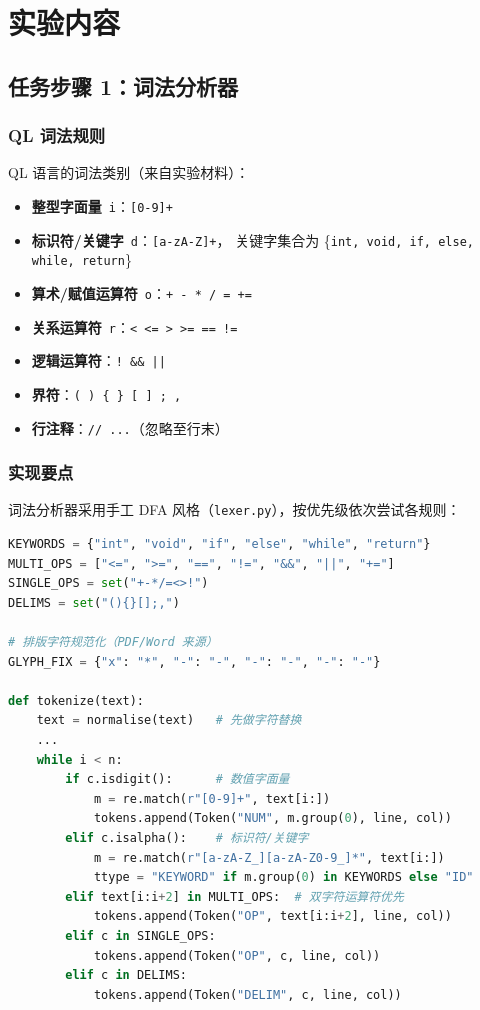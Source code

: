 \documentclass[12pt,a4paper]{ctexart}
\begin{document}
\section{实验内容}

\subsection{任务步骤 1：词法分析器}

\subsubsection{QL 词法规则}

QL 语言的词法类别（来自实验材料）：

\begin{itemize}
  \item \textbf{整型字面量}~\texttt{i}：\texttt{[0-9]+}
  \item \textbf{标识符/关键字}~\texttt{d}：\texttt{[a-zA-Z]+}，
        关键字集合为 \{\texttt{int, void, if, else, while, return}\}
  \item \textbf{算术/赋值运算符}~\texttt{o}：\texttt{+ - * / = +=}
  \item \textbf{关系运算符}~\texttt{r}：\texttt{< <= > >= == !=}
  \item \textbf{逻辑运算符}：\texttt{! \&\& ||}
  \item \textbf{界符}：\texttt{( ) \{ \} [ ] ; ,}
  \item \textbf{行注释}：\texttt{// ...}（忽略至行末）
\end{itemize}

\subsubsection{实现要点}

词法分析器采用手工 DFA 风格（\texttt{lexer.py}），按优先级依次尝试各规则：

\begin{lstlisting}[language=Python, caption={词法分析核心逻辑（lexer.py）}]
KEYWORDS = {"int", "void", "if", "else", "while", "return"}
MULTI_OPS = ["<=", ">=", "==", "!=", "&&", "||", "+="]
SINGLE_OPS = set("+-*/=<>!")
DELIMS = set("(){}[];,")

# 排版字符规范化（PDF/Word 来源）
GLYPH_FIX = {"x": "*", "-": "-", "-": "-", "-": "-"}

def tokenize(text):
    text = normalise(text)   # 先做字符替换
    ...
    while i < n:
        if c.isdigit():      # 数值字面量
            m = re.match(r"[0-9]+", text[i:])
            tokens.append(Token("NUM", m.group(0), line, col))
        elif c.isalpha():    # 标识符/关键字
            m = re.match(r"[a-zA-Z_][a-zA-Z0-9_]*", text[i:])
            ttype = "KEYWORD" if m.group(0) in KEYWORDS else "ID"
        elif text[i:i+2] in MULTI_OPS:  # 双字符运算符优先
            tokens.append(Token("OP", text[i:i+2], line, col))
        elif c in SINGLE_OPS:
            tokens.append(Token("OP", c, line, col))
        elif c in DELIMS:
            tokens.append(Token("DELIM", c, line, col))
\end{lstlisting}
\end{document}
